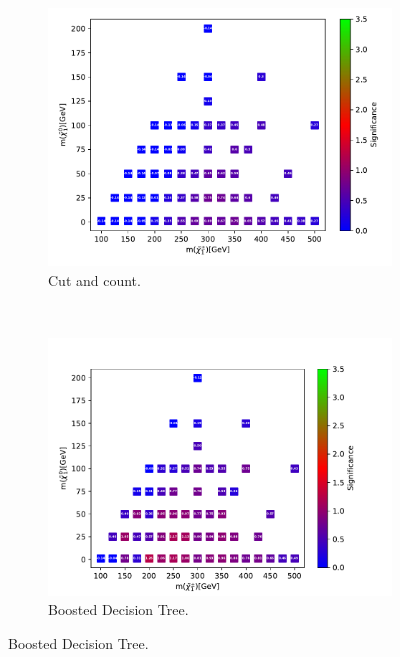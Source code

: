 \begin{figure}[H]
    \centering
    \begin{subfigure}[t!]{0.49\textwidth}
    \includegraphics[width = \textwidth]{Figures/Significances/significanceCutandCount_WW_all.pdf}
    \caption{Cut and count.}
        \label{fig:signHighWWcandc}
    \end{subfigure}
    \\
    \begin{subfigure}[t!]{0.49\textwidth}
    \includegraphics[width = \textwidth]{Figures/Significances/significance_BDT_WW_High_level.pdf}
    \caption{Boosted Decision Tree.}
        \label{fig:signHighWWBDT}
    \end{subfigure}      

\end{figure}
